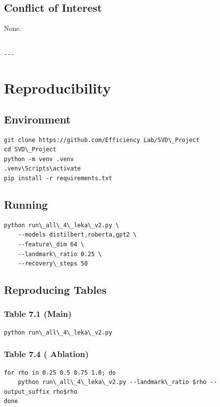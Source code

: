 \subsection{Conflict of Interest}

None.
\begin{lstlisting}

---
\end{lstlisting}

\section{Reproducibility}

\subsection{Environment}

\begin{lstlisting}
git clone https://github.com/Efficiency Lab/SVD\_Project
cd SVD\_Project
python -m venv .venv
.venv\Scripts\activate
pip install -r requirements.txt
\end{lstlisting}

\subsection{Running}

\begin{lstlisting}
python run\_all\_4\_leka\_v2.py \
    --models distilbert,roberta,gpt2 \
    --feature\_dim 64 \
    --landmark\_ratio 0.25 \
    --recovery\_steps 50
\end{lstlisting}

\subsection{Reproducing Tables}

\subsubsection{Table 7.1 (Main)}
\begin{lstlisting}
python run\_all\_4\_leka\_v2.py
\end{lstlisting}

\subsubsection{Table 7.4 (  Ablation)}
\begin{lstlisting}
for rho in 0.25 0.5 0.75 1.0; do
    python run\_all\_4\_leka\_v2.py --landmark\_ratio $rho --output_suffix rho$rho
done
\end{lstlisting}

